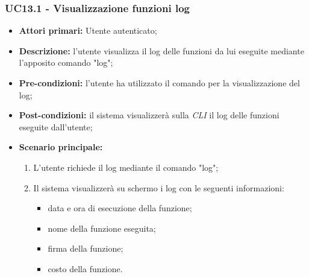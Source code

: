 \subsubsection{UC13.1 - Visualizzazione funzioni log}
\begin{itemize}
	\item \textbf{Attori primari:} Utente autenticato;
	\item \textbf{Descrizione:} l'utente visualizza il log delle funzioni da lui eseguite mediante l'apposito comando "log"; 
	\item \textbf{Pre-condizioni:} l'utente ha utilizzato il comando per la visualizzazione del log;
	\item \textbf{Post-condizioni:} il sistema visualizzerà sulla \textit{CLI\glo} il log delle funzioni eseguite dall'utente;
	\item \textbf{Scenario principale:} 
	\begin{enumerate}
		\item L'utente richiede il log mediante il comando "log";
		\item Il sistema visualizzerà su schermo i log con le seguenti informazioni:
		\begin{itemize}
			\item data e ora di esecuzione della funzione;
			\item nome della funzione eseguita;
			\item firma della funzione;
			\item costo della funzione.
		\end{itemize}
	\end{enumerate}
\end{itemize}